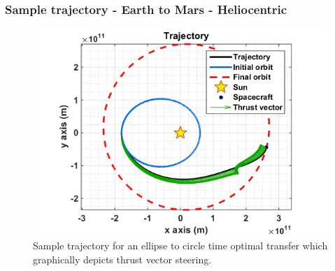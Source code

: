 \documentclass{beamer}
\begin{document}
\begin{frame}
\frametitle{Sample trajectory - Earth to Mars - Heliocentric}
\vspace{-3.25mm}
\begin{figure}
	\centering\includegraphics[width=0.75\linewidth]{Imgs/Sample_Traj.png}
	\caption{Sample trajectory for an ellipse to circle time optimal transfer which graphically depicts thrust vector steering.}
\end{figure}
\end{frame}

%			
%			

\end{document}
